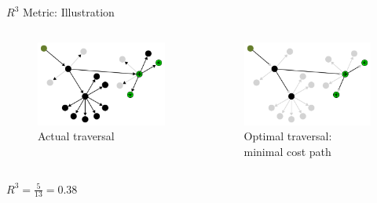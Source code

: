 \begin{frame}{$R^{3}$ Metric: Illustration}
  \centering
  \begin{columns}[c]
    \begin{figure}
      \includegraphics[width=\linewidth]{images/r3-metric-bad-traversal.pdf}
      \caption{\small Actual traversal}
    \end{figure}

    \begin{figure}
      \includegraphics[width=\linewidth]{images/r3-metric-good-traversal.pdf}
      \caption{\small Optimal traversal: minimal cost path}
    \end{figure}
  \end{columns}

  \vspace{1em}
  \small $ R^{3} = \frac{5}{13} = 0.38$
\end{frame}